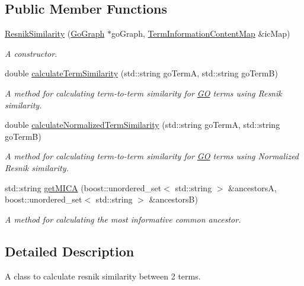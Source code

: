 \subsection*{Public Member Functions}
\begin{DoxyCompactItemize}
\item 
\hyperlink{classResnikSimilarity_a0e95354ebfc331dd4a73e823501378da}{Resnik\+Similarity} (\hyperlink{classGoGraph}{Go\+Graph} $\ast$go\+Graph, \hyperlink{classTermInformationContentMap}{Term\+Information\+Content\+Map} \&ic\+Map)
\begin{DoxyCompactList}\small\item\em A constructor. \end{DoxyCompactList}\item 
double \hyperlink{classResnikSimilarity_a340ace5dbdd105847d5fade4c8d20ade}{calculate\+Term\+Similarity} (std\+::string go\+TermA, std\+::string go\+TermB)
\begin{DoxyCompactList}\small\item\em A method for calculating term-\/to-\/term similarity for \hyperlink{namespaceGO}{GO} terms using Resnik similarity. \end{DoxyCompactList}\item 
double \hyperlink{classResnikSimilarity_a4e1d6ef4268a905a117fd0c054e4c39b}{calculate\+Normalized\+Term\+Similarity} (std\+::string go\+TermA, std\+::string go\+TermB)
\begin{DoxyCompactList}\small\item\em A method for calculating term-\/to-\/term similarity for \hyperlink{namespaceGO}{GO} terms using Normalized Resnik similarity. \end{DoxyCompactList}\item 
std\+::string \hyperlink{classResnikSimilarity_ace3ae20bcef468c53925e45c647584c0}{get\+M\+I\+CA} (boost\+::unordered\+\_\+set$<$ std\+::string $>$ \&ancestorsA, boost\+::unordered\+\_\+set$<$ std\+::string $>$ \&ancestorsB)
\begin{DoxyCompactList}\small\item\em A method for calculating the most informative common ancestor. \end{DoxyCompactList}\end{DoxyCompactItemize}


\subsection{Detailed Description}
A class to calculate resnik similarity between 2 terms. 


